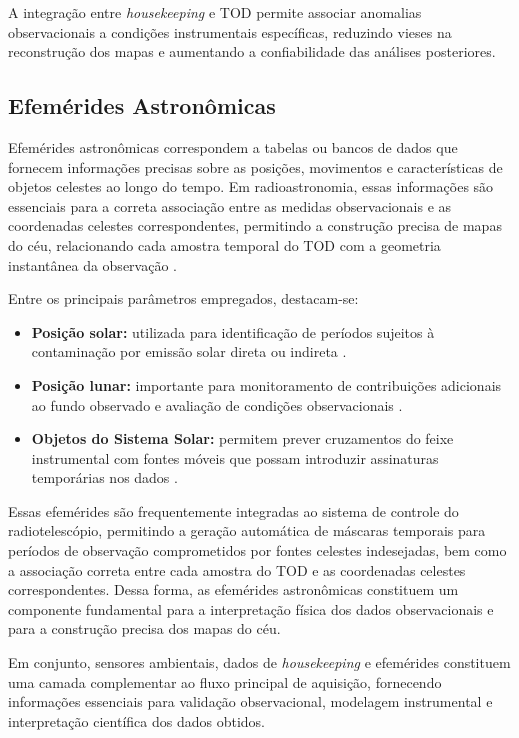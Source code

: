 A integração entre \textit{housekeeping} e TOD permite associar anomalias observacionais a condições instrumentais específicas, reduzindo vieses na reconstrução dos mapas e aumentando a confiabilidade das análises posteriores.


\subsection{Efemérides Astronômicas}
Efemérides astronômicas correspondem a tabelas ou bancos de dados que fornecem informações precisas sobre as posições, movimentos e características de objetos celestes ao longo do tempo. Em radioastronomia, essas informações são essenciais para a correta associação entre as medidas observacionais e as coordenadas celestes correspondentes, permitindo a construção precisa de mapas do céu, relacionando cada amostra temporal do TOD com a geometria instantânea da observação \cite{meeus1998astronomical,seidelmann2006explanatory}.

Entre os principais parâmetros empregados, destacam-se:

\begin{itemize}
\item \textbf{Posição solar:} utilizada para identificação de períodos sujeitos à contaminação por emissão solar direta ou indireta \cite{seidelmann2006explanatory}.
\item \textbf{Posição lunar:} importante para monitoramento de contribuições adicionais ao fundo observado e avaliação de condições observacionais \cite{meeus1998astronomical}.
\item \textbf{Objetos do Sistema Solar:} permitem prever cruzamentos do feixe instrumental com fontes móveis que possam introduzir assinaturas temporárias nos dados \cite{meeus1998astronomical,ahmed2015_phys_eng_detection}.
\end{itemize}

Essas efemérides são frequentemente integradas ao sistema de controle do radiotelescópio, permitindo a geração automática de máscaras temporais para períodos de observação comprometidos por fontes celestes indesejadas, bem como a associação correta entre cada amostra do TOD e as coordenadas celestes correspondentes. Dessa forma, as efemérides astronômicas constituem um componente fundamental para a interpretação física dos dados observacionais e para a construção precisa dos mapas do céu.

Em conjunto, sensores ambientais, dados de \textit{housekeeping} e efemérides constituem uma camada complementar ao fluxo principal de aquisição, fornecendo informações essenciais para validação observacional, modelagem instrumental e interpretação científica dos dados obtidos.

